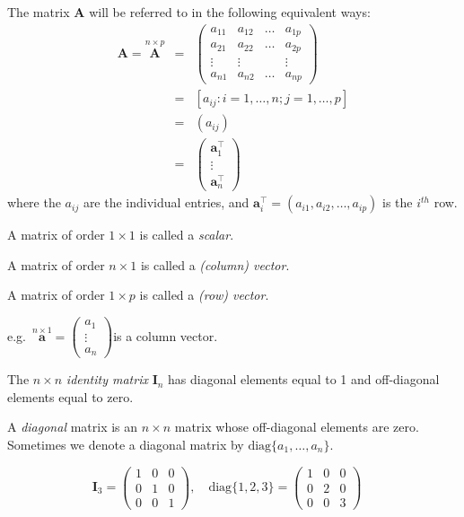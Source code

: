\documentclass[
]{book}
\theoremstyle{definition}
\theoremstyle{definition}
\theoremstyle{definition}
\theoremstyle{definition}
\theoremstyle{remark}
\begin{document}
The matrix \({\mathbf A}\) will be referred to in the following equivalent ways:
\begin{eqnarray*}
{\mathbf A}=\stackrel{n\times p}{\mathbf A} &=& \left(\begin{array}{cccc}
a_{11}&a_{12}&\dots&a_{1p}\\
a_{21}&a_{22}&\dots&a_{2p}\\
\vdots&\vdots&&\vdots\\
a_{n1}&a_{n2}&\dots&a_{np}
\end{array} \right) \\
&=&[a_{ij}: i=1, \ldots , n; j=1, \ldots , p]\\
&=&(a_{ij})\\
&=& \left( \begin{array}{c}\mathbf a_1^\top\\
\vdots\\
\mathbf a_n^\top\end{array}\right)
\end{eqnarray*}
where the \(a_{ij}\) are the individual entries, and \(\mathbf a_i^\top=(a_{i1}, a_{i2}, \ldots, a_{ip})\) is the \(i^{th}\) row.

A matrix of order \(1\times 1\) is called a \emph{scalar}.

A matrix of order \(n\times 1\) is called a \emph{(column) vector}.

A matrix of order \(1\times p\) is called a \emph{(row) vector}.

e.g.~\(\stackrel{n\times 1}{\mathbf a}=\left(
\begin{array}{c}
a_1\\\vdots\\a_n
\end{array}
\right)\)\quad is a column vector.

The \(n\times n\) \emph{identity matrix} \({\mathbf I}_n\) has diagonal elements equal to 1
and off-diagonal elements equal to zero.

A \emph{diagonal} matrix is an \(n \times n\) matrix whose
off-diagonal elements are zero. Sometimes we denote a diagonal
matrix by \(\text{diag}\{a_1,\ldots, a_n\}\).

\[\mathbf I_3 = \left(\begin{array}{ccc} 1&0&0\\ 0&1&0\\ 0&0&1\end{array}\right),\quad \text{diag}\{1,2,3\}=\left(\begin{array}{ccc} 1&0&0\\ 0&2&0\\ 0&0&3\end{array}\right)\quad\]
\end{document}

